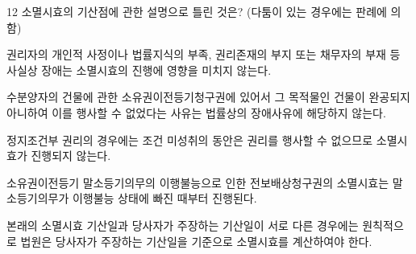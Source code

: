 \begin{question}{12}
소멸시효의 기산점에 관한 설명으로 틀린 것은? (다툼이 있는 경우에는 판례에 의함)
\begin{choices}
  \item 권리자의 개인적 사정이나 법률지식의 부족, 권리존재의 부지 또는 채무자의 부재 등 사실상 장애는 소멸시효의 진행에 영향을 미치지 않는다.
  \item 수분양자의 건물에 관한 소유권이전등기청구권에 있어서 그 목적물인 건물이 완공되지 아니하여 이를 행사할 수 없었다는 사유는 법률상의 장애사유에 해당하지 않는다.
  \item 정지조건부 권리의 경우에는 조건 미성취의 동안은 권리를 행사할 수 없으므로 소멸시효가 진행되지 않는다.
  \item 소유권이전등기 말소등기의무의 이행불능으로 인한 전보배상청구권의 소멸시효는 말소등기의무가 이행불능 상태에 빠진 때부터 진행된다.
  \item 본래의 소멸시효 기산일과 당사자가 주장하는 기산일이 서로 다른 경우에는 원칙적으로 법원은 당사자가 주장하는 기산일을 기준으로 소멸시효를 계산하여야 한다.
\end{choices}
\end{question}
